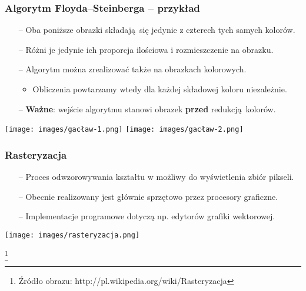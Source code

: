 \documentclass[usenames,dvipsnames,aspectratio=43,presentation]{beamer}
\begin{document}
    \begin{frame}
        \frametitle{Algorytm Floyda–Steinberga – przykład}
        \footnotesize

        \begin{itemize}
            \item[--] Oba poniższe obrazki składają się jedynie z czterech tych samych kolorów.
            \item[--] Różni je jedynie ich proporcja ilościowa i rozmieszczenie na obrazku.
            \item[--] Algorytm można zrealizować także na obrazkach kolorowych.
                      \begin{itemize}
                          \scriptsize
                          \item Obliczenia powtarzamy wtedy dla każdej składowej koloru niezależnie.
                      \end{itemize}
            \item[--] \textbf{Ważne}: wejście algorytmu stanowi obrazek \textbf{przed} redukcją kolorów.
        \end{itemize}

        \vfill

        \begin{minipage}{\textwidth}
            \centering

            \texttt{[image: images/gacław-1.png]}
            \texttt{[image: images/gacław-2.png]}
        \end{minipage}
    \end{frame}


    \begin{frame}
        \frametitle{Rasteryzacja}
        \footnotesize

        \begin{itemize}
            \item[--] Proces odwzorowywania kształtu w możliwy do wyświetlenia zbiór pikseli.
            \item[--] Obecnie realizowany jest głównie sprzętowo przez procesory graficzne.
            \item[--] Implementacje programowe dotyczą np. edytorów grafiki wektorowej.
        \end{itemize}

        \vfill

        \begin{minipage}{\textwidth}
            \centering

            \texttt{[image: images/rasteryzacja.png]}
        \end{minipage}
        
        \let\thefootnote\relax\footnote[frame]{
            \tiny
            \hspace{-3.25em}
            Źródło obrazu:
            http://pl.wikipedia.org/wiki/Rasteryzacja
        }
    \end{frame}
\end{document}
